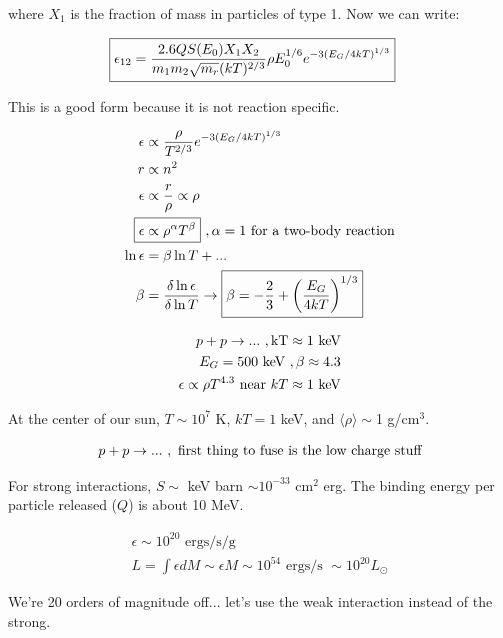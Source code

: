 where $X_{1}$ is the fraction of mass in particles of type 1. Now we can write:

\begin{align}
\Aboxed{\epsilon_{12} &= \frac{2.6QS(E_{0})X_{1}X_{2}}{m_{1}m_{2}\sqrt{m_{r}} (kT)^{2/3}} \rho E_{0}^{1/6} e^{-3(E_{G}/4kT)^{1/3}}}
\end{align}

This is a good form because it is not reaction specific. 

\begin{align}
\epsilon &\pt \frac{\rho}{T^{2/3}}e^{-3(E_{G}/4kT)^{1/3}}\\
r &\pt n^{2}\\
\epsilon &\pt \frac{r}{\rho} \pt \rho\\
\Aboxed{\epsilon &\pt \rho^{\alpha}T^{\beta}}~,\alpha=1\textrm{ for a two-body reaction}\\
\ln \epsilon &= \beta \ln T + ...\\
\beta &= \frac{\delta \ln \epsilon}{\delta \ln T} \ra \boxed{ \beta = -\frac{2}{3} + \lp \frac{E_{G}}{4kT} \rp^{1/3}}
\end{align}

\begin{align}
p + p\rightarrow ...~,\textrm{kT}\approx 1\textrm{ keV}\\
E_{G} = 500 \textrm{ keV}~,\beta \approx 4.3\\
\epsilon \propto \rho T^{4.3} \textrm{ near } kT \approx 1\textrm{ keV}
\end{align}

At the center of our sun, $T \sim 10^{7}$ K, $kT=1$ keV, and $\langle \rho\rangle \sim$1 g/cm$^{3}$.

\begin{align}
p + p \rightarrow ... ~,\textrm{ first thing to fuse is the low charge stuff}
\end{align}

For strong interactions, $S \sim $ keV barn $\sim 10^{-33}$ cm$^{2}$ erg. The binding energy per particle released ($Q$) is about 10 MeV. 

\begin{align}
\epsilon \sim 10^{20}\textrm{ ergs/s/g}\\
L = \int \epsilon dM \sim \epsilon M \sim 10^{54}\textrm{ ergs/s } \sim 10^{20} L_{\odot}
\end{align}

We're 20 orders of magnitude off... let's use the weak interaction instead of the strong. 